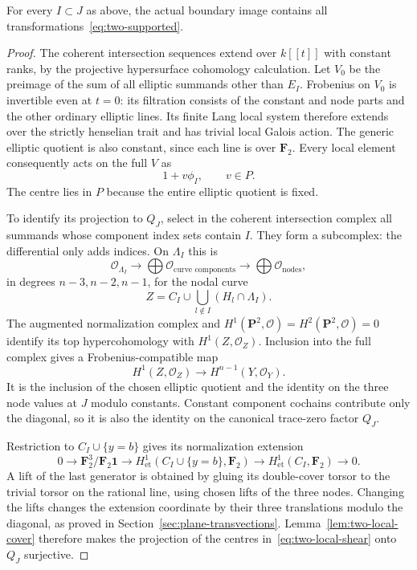 \begin{proposition}\label{prop:two-supported}
For every $I\subset J$ as above, the actual boundary image contains all transformations~\eqref{eq:two-supported}.
\end{proposition}
\begin{proof}
The coherent intersection sequences extend over $k[[t]]$ with constant ranks, by the projective hypersurface cohomology calculation. Let $V_0$ be the preimage of the sum of all elliptic summands other than $E_I$. Frobenius on $V_0$ is invertible even at $t=0$: its filtration consists of the constant and node parts and the other ordinary elliptic lines. Its finite Lang local system therefore extends over the strictly henselian trait and has trivial local Galois action. The generic elliptic quotient is also constant, since each line is over $\mathbf F_2$. Every local element consequently acts on the full $V$ as
\begin{equation}\label{eq:two-local-shear}
1+v\phi_I,\qquad v\in P.
\end{equation}
The centre lies in $P$ because the entire elliptic quotient is fixed.

To identify its projection to $Q_J$, select in the coherent intersection complex all summands whose component index sets contain $I$. They form a subcomplex: the differential only adds indices. On $\Lambda_I$ this is
\[
\mathcal O_{\Lambda_I}\longrightarrow
\bigoplus\mathcal O_{\text{curve components}}\longrightarrow
\bigoplus\mathcal O_{\text{nodes}},
\]
in degrees $n-3,n-2,n-1$, for the nodal curve
\[
Z=C_I\cup\bigcup_{l\notin I}(H_l\cap\Lambda_I).
\]
The augmented normalization complex and $H^1(\mathbf P^2,\mathcal O)=H^2(\mathbf P^2,\mathcal O)=0$ identify its top hypercohomology with $H^1(Z,\mathcal O_Z)$. Inclusion into the full complex gives a Frobenius-compatible map
\[
H^1(Z,\mathcal O_Z)\longrightarrow H^{n-1}(Y,\mathcal O_Y).
\]
It is the inclusion of the chosen elliptic quotient and the identity on the three node values at $J$ modulo constants. Constant component cochains contribute only the diagonal, so it is also the identity on the canonical trace-zero factor $Q_J$.

Restriction to $C_I\cup\{y=b\}$ gives its normalization extension
\[
0\longrightarrow\mathbf F_2^3/\mathbf F_2\mathbf1
\longrightarrow H^1_{\mathrm{et}}(C_I\cup\{y=b\},\mathbf F_2)
\longrightarrow H^1_{\mathrm{et}}(C_I,\mathbf F_2)\longrightarrow0.
\]
A lift of the last generator is obtained by gluing its double-cover torsor to the trivial torsor on the rational line, using chosen lifts of the three nodes. Changing the lifts changes the extension coordinate by their three translations modulo the diagonal, as proved in Section~\ref{sec:plane-transvections}. Lemma~\ref{lem:two-local-cover} therefore makes the projection of the centres in~\eqref{eq:two-local-shear} onto $Q_J$ surjective.


\end{proof}
